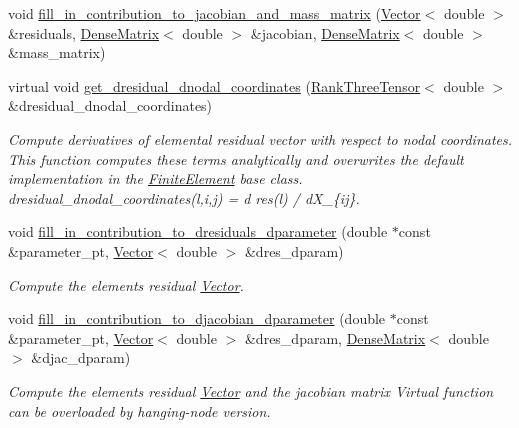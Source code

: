 \begin{DoxyCompactItemize}
void \hyperlink{classoomph_1_1GeneralisedNewtonianAxisymmetricNavierStokesEquations_ad682da5b2fcbdf34c538a8aa54350aef}{fill\+\_\+in\+\_\+contribution\+\_\+to\+\_\+jacobian\+\_\+and\+\_\+mass\+\_\+matrix} (\hyperlink{classoomph_1_1Vector}{Vector}$<$ double $>$ \&residuals, \hyperlink{classoomph_1_1DenseMatrix}{Dense\+Matrix}$<$ double $>$ \&jacobian, \hyperlink{classoomph_1_1DenseMatrix}{Dense\+Matrix}$<$ double $>$ \&mass\+\_\+matrix)
\item 
virtual void \hyperlink{classoomph_1_1GeneralisedNewtonianAxisymmetricNavierStokesEquations_a741048e47acae2bdbda0cee6aaf0b4b0}{get\+\_\+dresidual\+\_\+dnodal\+\_\+coordinates} (\hyperlink{classoomph_1_1RankThreeTensor}{Rank\+Three\+Tensor}$<$ double $>$ \&dresidual\+\_\+dnodal\+\_\+coordinates)
\begin{DoxyCompactList}\small\item\em Compute derivatives of elemental residual vector with respect to nodal coordinates. This function computes these terms analytically and overwrites the default implementation in the \hyperlink{classoomph_1_1FiniteElement}{Finite\+Element} base class. dresidual\+\_\+dnodal\+\_\+coordinates(l,i,j) = d res(l) / d\+X\+\_\+\{ij\}. \end{DoxyCompactList}\item 
void \hyperlink{classoomph_1_1GeneralisedNewtonianAxisymmetricNavierStokesEquations_a863e502006b214a160e50868b803ffa9}{fill\+\_\+in\+\_\+contribution\+\_\+to\+\_\+dresiduals\+\_\+dparameter} (double $\ast$const \&parameter\+\_\+pt, \hyperlink{classoomph_1_1Vector}{Vector}$<$ double $>$ \&dres\+\_\+dparam)
\begin{DoxyCompactList}\small\item\em Compute the element\textquotesingle{}s residual \hyperlink{classoomph_1_1Vector}{Vector}. \end{DoxyCompactList}\item 
void \hyperlink{classoomph_1_1GeneralisedNewtonianAxisymmetricNavierStokesEquations_a0b1b64308af0b8f6d5cd553e6f471413}{fill\+\_\+in\+\_\+contribution\+\_\+to\+\_\+djacobian\+\_\+dparameter} (double $\ast$const \&parameter\+\_\+pt, \hyperlink{classoomph_1_1Vector}{Vector}$<$ double $>$ \&dres\+\_\+dparam, \hyperlink{classoomph_1_1DenseMatrix}{Dense\+Matrix}$<$ double $>$ \&djac\+\_\+dparam)
\begin{DoxyCompactList}\small\item\em Compute the element\textquotesingle{}s residual \hyperlink{classoomph_1_1Vector}{Vector} and the jacobian matrix Virtual function can be overloaded by hanging-\/node version. \end{DoxyCompactList}\item 

\end{DoxyCompactItemize}

